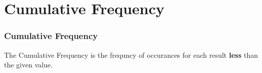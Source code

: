 \section{Cumulative Frequency}


\begin{frame}
  \frametitle{Cumulative Frequency}

  \begin{definition}
    The Cumulative Frequency is the frequncy of occurances for each
    result \textbf{less} than the given value.
  \end{definition}

\end{frame}


